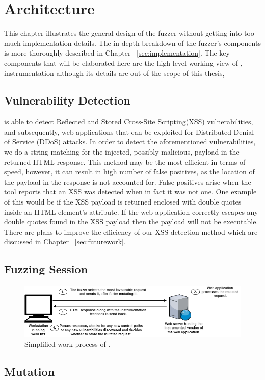 \chapter{Architecture}
\label{sec:architecture}
\minitoc
\vspace*{1cm}

This chapter illustrates the general design of the fuzzer without getting into too much implementation details. The in-depth breakdown of the fuzzer's components is more thoroughly described in Chapter ~\ref{sec:implementation}. The key components that will be elaborated here are the high-level working view of \pname{}, instrumentation although its details are out of the scope of this thesis, 

\section{Vulnerability Detection}
\pname{} is able to detect Reflected and Stored Cross-Site Scripting(XSS) vulnerabilities, and subsequently, web applications that can be exploited for Distributed Denial of Service (DDoS) attacks. In order to detect the aforementioned vulnerabilities, we do a string-matching for the injected, possibly malicious, payload in the returned HTML response. This method may be the most efficient in terms of speed, however, it can result in high number of false positives, as the location of the payload in the response is not accounted for. False positives arise when the tool reports that an XSS was detected when in fact it was not one. One example of this would be if the XSS payload is returned enclosed with double quotes inside an HTML element's attribute. If the web application correctly escapes any double quotes found in the XSS payload then the payload will not be executable. There are plans to improve the efficiency of our XSS detection method which are discussed in Chapter ~\ref{sec:futurework}.

\section{Fuzzing Session}

\begin{figure}[ht]
 \centering
 \captionsetup{justification=centering}
 \includegraphics[width=5.0in]{figures/architecture.png}
 \caption{Simplified work process of \pname{}.}
 \label{fig:reflectedxss}
\end{figure}

\section{Mutation}
